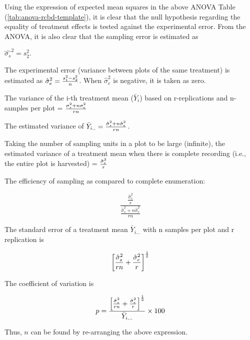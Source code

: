 \documentclass[
  ignorenonframetext,
  aspectratio=169]{beamer}
\begin{document}
\begin{frame}{}
\protect\hypertarget{section-8}{}
\small

Using the expression of expected mean squares in the above ANOVA Table
(\ref{tab:anova-rcbd-template}), it is clear that the null hypothesis
regarding the equality of treatment effects is tested against the
experimental error. From the ANOVA, it is also clear that the sampling
error is estimated as

\(\hat{\sigma_s}^2 = s_2^2\).

The experimental error (variance between plots of the same treatment) is
estimated as \(\large \hat{\sigma}_e^2 = \frac{s_1^2 - s_2^2}{n}\). When
\(\hat{\sigma}_e^2\) is negative, it is taken as zero.

The variance of the i-th treatment mean (\(\bar{Y}_i\)) based on
r-replications and n-samples per plot =
\({\large \frac{\sigma_s^2 + n \sigma_e^2}{rn}}\)

The estimated variance of
\(\large \bar{Y}_{i..} = \frac{\hat{\sigma}_s^2 + n\hat{\sigma}_e^2}{rn}\).

Taking the number of sampling units in a plot to be large (infinite),
the estimated variance of a treatment mean when there is complete
recording (i.e., the entire plot is harvested) =
\(\large \frac{\hat{\sigma}_e^2}{r}\)
\end{frame}

\begin{frame}{}
\protect\hypertarget{section-9}{}
\small

The efficiency of sampling as compared to complete enumeration:

\[
\frac{\frac{\hat{\sigma}_e^2}{r}}{\frac{\hat{\sigma}_s^2 + n \hat{\sigma}_e^2}{rn}}
\]

The standard error of a treatment mean \(\bar{Y}_{i...}\) with n samples
per plot and r replication is

\[
\small
\left[ \frac{\hat{\sigma}_s^2}{rn} + \frac{\hat{\sigma}_e^2}{r} \right]^{\frac{1}{2}}
\]

The coefficient of variation is

\[
\small 
p = \frac{\left[ \frac{\hat{\sigma}_s^2}{rn} + \frac{\hat{\sigma}_e^2}{r} \right]^{\frac{1}{2}}}{\bar{Y}_{i...}} \times 100
\]

Thus, \(n\) can be found by re-arranging the above expression.
\end{frame}
\end{document}
